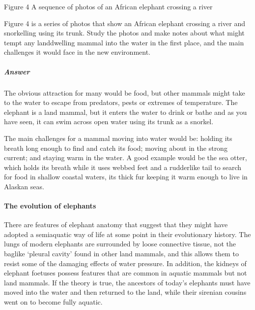 \documentclass[letterpaper,10pt,english]{sphinxmanual}
\begin{document}
Figure 4 A sequence of photos of an African elephant crossing a river

Figure 4 is a series of photos that show an African elephant crossing a river and snorkelling using its trunk. Study the photos and make notes about what might tempt any land\sphinxhyphen{}dwelling mammal into the water in the first place, and the main challenges it would face in the new environment.


\subparagraph{Answer}
\label{\detokenize{content/session_00/Part_00_02:Answer}}
The obvious attraction for many would be food, but other mammals might take to the water to escape from predators, pests or extremes of temperature. The elephant is a land mammal, but it enters the water to drink or bathe and as you have seen, it can swim across open water using its trunk as a snorkel.

The main challenges for a mammal moving into water would be: holding its breath long enough to find and catch its food; moving about in the strong current; and staying warm in the water. A good example would be the sea otter, which holds its breath while it uses webbed feet and a rudder\sphinxhyphen{}like tail to search for food in shallow coastal waters, its thick fur keeping it warm enough to live in Alaskan seas.


\paragraph{The evolution of elephants}
\label{\detokenize{content/session_00/Part_00_02:The-evolution-of-elephants}}
There are features of elephant anatomy that suggest that they might have adopted a semi\sphinxhyphen{}aquatic way of life at some point in their evolutionary history. The lungs of modern elephants are surrounded by loose connective tissue, not the bag\sphinxhyphen{}like ‘pleural cavity’ found in other land mammals, and this allows them to resist some of the damaging effects of water pressure. In addition, the kidneys of elephant foetuses possess features that are common in aquatic mammals but not land mammals. If the
theory is true, the ancestors of today’s elephants must have moved into the water and then returned to the land, while their sirenian cousins went on to become fully aquatic.
\end{document}
